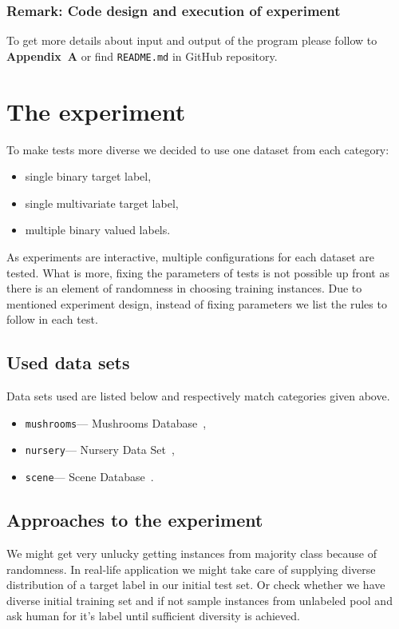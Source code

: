 \documentclass[12pt, a4paper, pdflatex]{report}
\begin{document}
\subsubsection{Remark: Code design and execution of experiment}
To get more details about input and output of the program please follow to \textbf{Appendix~A} or find \texttt{README.md} in GitHub repository\cite{githubcode}.

\section{The experiment}
To make tests more diverse we decided to use one dataset from each category:
\begin{itemize}
\item single binary target label,
\item single multivariate target label,%
\item multiple binary valued labels.
\end{itemize}
As experiments are interactive, multiple configurations for each dataset are tested. What is more, fixing the parameters of tests is not possible up front as there is an element of randomness in choosing training instances. Due to mentioned experiment design, instead of fixing parameters we list the rules to follow in each test.

\subsection{Used data sets}
Data sets used are listed below and respectively match categories given above.
\begin{itemize}
\item \texttt{mushrooms}--- Mushrooms Database~\cite{mushroomsDS},
\item \texttt{nursery}--- Nursery Data Set~\cite{nurseryDS},
\item \texttt{scene}--- Scene Database~\cite{sceneDS}.
\end{itemize}

\subsection{Approaches to the experiment}
We might get very unlucky getting instances from majority class because of randomness. In real-life application we might take care of supplying diverse distribution of a target label in our initial test set. Or check whether we have diverse initial training set and if not sample instances from unlabeled pool and ask human for it's label until sufficient diversity is achieved.
\end{document}
